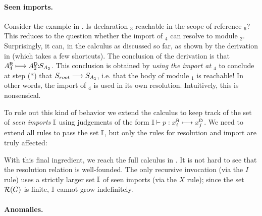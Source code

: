\paragraph{Seen imports.}

Consider the example in . 
Is declaration $_3$ reachable in the scope of reference
$_6$?
This reduces to the question whether the import of $_4$ can resolve to
module $_2$.
Surprisingly, it can, in the calculus as discussed so far, as shown by the
derivation in  (which takes a few shortcuts).
The conclusion of the derivation is that 
${A}^{\mbox{\scriptsize\sf R}}_{4} \longmapsto {A}^{\mbox{\scriptsize\sf D}}_{2}\!\!:\!\!{S_{A_2}}$.
This conclusion is obtained by \emph{using the import at $_4$}
to conclude at step (*) that $S_{root} \stackrel{}{\longrightarrow} S_{A_1}$, i.e. that the body of
module $_1$ is reachable!
In other words, the import of $_4$ is used in its own
resolution.  Intuitively, this is nonsensical.

To rule out this kind of behavior we extend the calculus to keep track of the
set of \emph{seen imports} $\mathbb{I}$ using judgements of the form 
$\mathbb{I} \vdash p : {x}^{\mbox{\scriptsize\sf R}}_{i} \longmapsto {x}^{\mbox{\scriptsize\sf D}}_{j}$. 
We need to extend all rules to pass the set $\mathbb{I}$, but only the rules
for resolution and import are truly affected:



\vspace*{-1.5\baselineskip}




With this final ingredient, we reach the full calculus in .
It is not hard to see that the resolution relation is well-founded. The only
recursive invocation (via the $I$ rule) uses a strictly larger set $\mathbb{I}$
of seen imports (via the $X$ rule); since the set $\mathcal{R}(G)$ is finite, $\mathbb{I}$ cannot
grow indefinitely.

\paragraph{Anomalies.}

